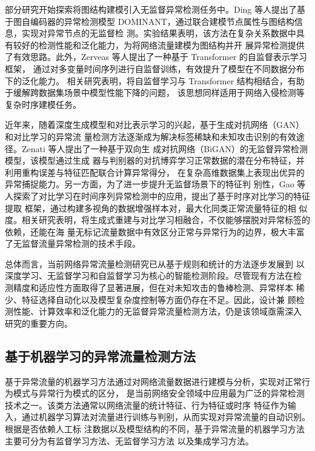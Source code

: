 部分研究开始探索将图结构建模引入无监督异常检测任务中。Ding 等人提出了基于图自编码器的异常检测模型 
DOMINANT\cite{Ding2019DOMINANT}，通过联合建模节点属性与图结构信息，实现对异常节点的无监督检
测。实验结果表明，该方法在复杂关系数据中具有较好的检测性能和泛化能力，为将网络流量建模为图结构并开
展异常检测提供了有效思路。此外，Zerveas 等人提出了一种基于 Transformer 的自监督表示学习框架，
通过对多变量时间序列进行自监督训练，有效提升了模型在不同数据分布下的泛化能力\cite{zerveas2021transformer}。
相关研究表明，将自监督学习与 Transformer 结构相结合，有助于缓解跨数据集场景中模型性能下降的问题，
该思想同样适用于网络入侵检测等复杂时序建模任务。

近年来，随着深度生成模型和对比表示学习的兴起，基于生成对抗网络（GAN）和对比学习的异常流
量检测方法逐渐成为解决标签稀缺和未知攻击识别的有效途径。Zenati 等人提出了一种基于双向生
成对抗网络（BiGAN）的无监督异常检测模型\cite{zenati2018efficient}，该模型通过生成
器与判别器的对抗博弈学习正常数据的潜在分布特征，并利用重构误差与特征匹配联合计算异常得分，
在复杂高维数据集上表现出优异的异常捕捉能力。另一方面，为了进一步提升无监督场景下的特征判
别性，Gao 等人探索了对比学习在时间序列异常检测中的应用，提出了基于时序对比学习的特征提取
框架\cite{gao2021simcse}，通过构建多视角的数据增强样本对，最大化同类正常流量特征的相
似度。相关研究表明，将生成式重建与对比学习相融合，不仅能够摆脱对异常标签的依赖，还能在海
量无标记流量数据中有效区分正常与异常行为的边界，极大丰富了无监督流量异常检测的技术手段。

总体而言，当前网络异常流量检测研究已从基于规则和统计的方法逐步发展到
以深度学习、无监督学习和自监督学习为核心的智能检测阶段。尽管现有方法在检
测精度和适应性方面取得了显著进展，但在对未知攻击的鲁棒检测、异常样本
稀少、特征选择自动化以及模型复杂度控制等方面仍存在不足。因此，设计兼
顾检测性能、计算效率和泛化能力的无监督异常流量检测方法，仍是该领域亟需深入
研究的重要方向。

\subsection{基于机器学习的异常流量检测方法}

基于异常流量的机器学习方法通过对网络流量数据进行建模与分析，实现对正常行为模式与异常行为模式的区分，
是当前网络安全领域中应用最为广泛的异常检测技术之一。该类方法通常以网络流量的统计特征、行为特征或时序
特征作为输入，通过机器学习算法对流量进行训练与判别，从而实现对异常流量的自动识别。根据是否依赖人工标
注数据以及模型结构的不同，基于异常流量的机器学习方法主要可分为有监督学习方法、无监督学习方法\cite{nassif2021machine}
以及集成学习方法。 

